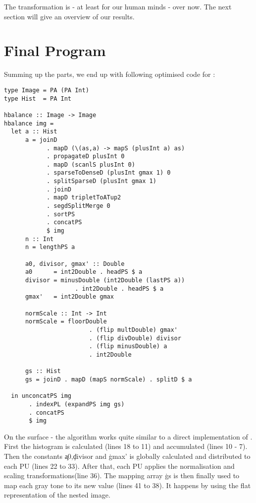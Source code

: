        The transformation is - at least for our human minds - over now. The next
       section will give an overview of our results.
           
  \section{Final Program}
    Summing up the parts, we end up with following optimised code for \ndpv:
    \begin{lstlisting}
type Image = PA (PA Int)
type Hist  = PA Int

hbalance :: Image -> Image
hbalance img =
  let a :: Hist
      a = joinD
            . mapD (\(as,a) -> mapS (plusInt a) as)
            . propagateD plusInt 0
            . mapD (scanlS plusInt 0)
            . sparseToDenseD (plusInt gmax 1) 0
            . splitSparseD (plusInt gmax 1)
            . joinD
            . mapD tripletToATup2
            . segdSplitMerge 0
            . sortPS
            . concatPS
            $ img
      n :: Int
      n = lengthPS a
      
      a0, divisor, gmax' :: Double
      a0      = int2Double . headPS $ a
      divisor = minusDouble (int2Double (lastPS a))
                    . int2Double . headPS $ a
      gmax'   = int2Double gmax
      
      normScale :: Int -> Int
      normScale = floorDouble
                        . (flip multDouble) gmax'
                        . (flip divDouble) divisor
                        . (flip minusDouble) a
                        . int2Double
        
      gs :: Hist
      gs = joinD . mapD (mapS normScale) . splitD $ a
      
  in unconcatPS img
       . indexPL (expandPS img gs)
       . concatPS
       $ img
    \end{lstlisting}
    On the surface - the algorithm works quite similar to a direct
    implementation of \ndpn.
    First the histogram is calculated (lines 18 to 11) and accumulated (lines 10 - 7).
    Then the constants \c{a0},\c{divisor} and \c{gmax'} is globally calculated and distributed
    to each PU (lines 22 to 33). After that, each PU applies the normalisation and scaling transformations(line 36).
    The mapping array \c{gs} is then finally used to map
    each gray tone to its new value (lines 41 to 38). It happens by using the
    flat representation of the nested image.
    
